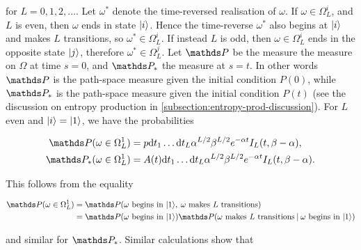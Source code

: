 for $L = 0, 1, 2, \ldots$. Let $\omega^\ast$ denote the time-reversed realisation of $\omega$. If $\omega \in \Omega_L^i$, and $L$ is even, then $\omega$ ends in state $\ket{i}$. Hence the time-reverse $\omega^\ast$ also begins at $\ket{i}$ and makes $L$ transitions, so $\omega^\ast \in \Omega^i_L$. If instead $L$ is odd, then $\omega \in \Omega^i_L$ ends in the opposite state $\ket{j}$, therefore $\omega^\ast \in \Omega^j_L$. Let $\bP$ be the measure the measure on $\Omega$ at time $s=0$, and $\bP_\ast$ the measure at $s = t$. In other words $\bP$ is the path-space measure given the initial condition $P(0)$, while $\bP_\ast$ is the path-space measure given the initial condition $P(t)$ (see the discussion on entropy production in \ref{subsection:entropy-prod-discussion}). For $L$ even and $\ket{i} = \ket{1}$, we have the probabilities

\begin{align}
\begin{split}
\bP(\omega \in \Omega_L^1) &= p\rmd t_1 \ldots \rmd t_L \alpha^{L/2}\beta^{L/2}e^{-\alpha t}I_L(t,\beta - \alpha),\\
\bP_\ast(\omega \in \Omega_L^1) &= A(t) \rmd t_1 \ldots \rmd t_L \alpha^{L/2}\beta^{L/2}e^{-\alpha t}I_L(t,\beta - \alpha).
\end{split}
\end{align}

This follows from the equality 

\begin{align}
\begin{split}
\bP(\omega \in \Omega_L^1) &= \bP(\text{$\omega$ begins in $\ket{1}$}, \: \text{$\omega$ makes $L$ transitions})\\
&= \bP(\text{$\omega$ begins in $\ket{1}$})\bP(\text{$\omega$ makes $L$ transitions} \: |\: \text{$\omega$ begins in $\ket{1}$})
\end{split}
\end{align}

and similar for $\bP_\ast$. Similar calculations show that 


